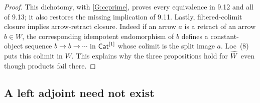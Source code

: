 \begin{proof}
This dichotomy, with \ref{G:ccprime}, proves every equivalence in
9.12 and all of 9.13; it also restores the missing implication of
9.11.  Lastly, filtered-colimit closure implies arrow-retract closure.
Indeed if an arrow $a$ is a retract of an arrow $b\in W$, the
corresponding idempotent endomorphism of $b$ defines a constant-object
sequence $b\to b\to\cdots$ in $\mathsf{Cat}^{[1]}$ whose colimit is the
split image $a$.  Loc~(8) puts this colimit in $W$.  This explains why
the three propositions hold for $\widetilde W$ even though products fail there.
\end{proof}

\subsection{A left adjoint need not exist}

